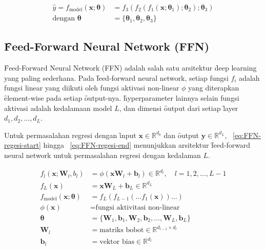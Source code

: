     \begin{align}
        \label{eq:deep-learning-FFN-dag}
        \hat y = f_{\text{model}}(\mathbf{x}; \bm{\theta}) &= f_3(f_2(f_1(\mathbf{x}; \bm{\theta}_1); \bm{\theta}_2); \bm{\theta}_3) \\
        \label{eq:deep-learning-FFN-dag-end}
        \text{dengan } \bm{\theta} &= \{\bm{\theta}_1, \bm{\theta}_2, \bm{\theta}_3\}
    \end{align}

    \subsection{\f{Feed-Forward Neural Network} (FFN)}

    \f{Feed-Forward Neural Network} (FFN) adalah salah satu arsitektur \f{deep learning} yang paling sederhana. Pada \f{feed-forward neural network}, setiap fungsi $f_i$ adalah fungsi linear yang diikuti oleh fungsi aktivasi non-linear $\phi$  yang diterapkan \f{element-wise} pada setiap \f{output}-nya. \f{hyperparameter} lainnya selain fungsi aktivasi adalah kedalamaan model $L$, dan dimensi \f{output} dari setiap \f{layer} $d_1, d_2, \dots, d_L$.

    Untuk permasalahan regresi dengan \f{input} $\mathbf{x}\in \mathbb{R}^{d_0}$ dan \f{output} $\mathbf{y} \in \mathbb{R}^{d_L}$, \equ~\ref{eq:FFN-regesi-start} hingga \equ~\ref{eq:FFN-regesi-end} menunjukkan arsitektur \f{feed-forward neural network} untuk permasalahan regresi dengan kedalaman $L$.


    \begin{align}
        \label{eq:FFN-regesi-start}
        f_l(\mathbf{x};\mathbf{W}_l, b_l) &= \phi( \mathbf{x} \mathbf{W}_l + \mathbf{b}_l) \in \mathbb{R}^{d_l}, \quad l = 1, 2, \dots, L-1 \\
        f_L(\mathbf{x}) &= \mathbf{x} \mathbf{W}_L + \mathbf{b}_L \in \mathbb{R}^{d_L} \\
        f_{\text{model}}(\mathbf{x};\bm{\theta}) &= f_L(f_{L-1}(\dots f_1(\mathbf{x})) \dots) \\
        \phi(\mathbf{x}) &= \text{fungsi aktivitasi non-linear} \\
        \bm{\theta} &= \{\mathbf{W}_1, \mathbf{b}_1, \mathbf{W}_2, \mathbf{b}_2, \dots, \mathbf{W}_L, \mathbf{b}_L\} \\
        \mathbf{W}_l &= \text{matriks bobot}  \in \mathbb{R}^{d_{l-1} \times d_l} \\
        \label{eq:FFN-regesi-end}
        \mathbf{b}_l &= \text{vektor bias} \in \mathbb{R}^{d_l}
    \end{align} 


